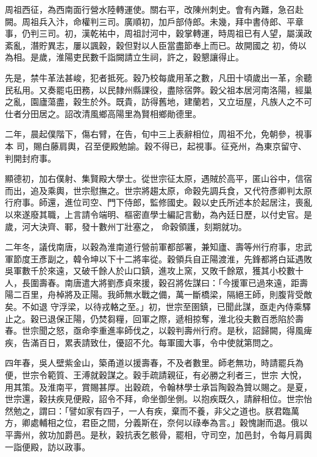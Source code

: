 \begin{pinyinscope}
 周祖西征，為西南面行營水陸轉運使。關右平，改陳州刺史。會有內難，急召赴闕。周祖兵入汴，命權判三司。廣順初，加戶部侍郎。未幾，拜中書侍郎、平章事，仍判三司。初，漢乾祐中，周祖討河中，穀掌轉運，時周祖已有人望，屬漢政紊亂，潛貯異志，屢以諷穀，穀但對以人臣當盡節奉上而已。故開國之
 初，倚以為相。是歲，淮陽吏民數千詣闕請立生祠，許之，穀懇讓得止。



 先是，禁牛革法甚峻，犯者抵死。穀乃校每歲用革之數，凡田十頃歲出一革，余聽民私用。又奏罷屯田務，以民隸州縣課役，盡除宿弊。穀父祖本居河南洛陽，經巢之亂，園廬蕩盡，穀生於外。既貴，訪得舊地，建蘭若，又立垣屋，凡族人之不可仕者分田居之。詔改清風鄉高陽里為賢相鄉勛德里。



 二年，晨起僕階下，傷右臂，在告，旬中三上表辭相位，周祖不允，免朝參，視事本
 司，賜白藤肩輿，召至便殿勉諭。穀不得已，起視事。征兗州，為東京留守、判開封府事。



 顯德初，加右僕射、集賢殿大學士。從世宗征太原，遇賊於高平，匿山谷中，信宿而出，追及乘輿，世宗慰撫之。世宗將趨太原，命穀先調兵食，又代符彥卿判太原行府事。師還，進位司空、門下侍郎，監修國史。穀以史氏所述本於起居注，喪亂以來遂廢其職，上言請令端明、樞密直學士編記言動，為內廷日歷，以付史官。是歲，河大決齊、鄆，發十數州丁壯塞之，
 命穀領護，刻期就功。



 二年冬，議伐南唐，以穀為淮南道行營前軍都部署，兼知廬、壽等州行府事，忠武軍節度王彥副之，韓令坤以下十二將率從。穀領兵自正陽渡淮，先鋒都將白延遇敗吳軍數千於來遠，又破千餘人於山口鎮，進攻上窯，又敗千餘眾，獲其小校數十人，長圍壽春。南唐遣大將劉彥貞來援，穀召將佐謀曰：「今援軍已過來遠，距壽陽二百里，舟棹將及正陽。我師無水戰之備，萬一斷橋梁，隔絕王師，則腹背受敵矣。不如退
 守浮梁，以待戎輅之至。」初，世宗至圉鎮，已聞此謀，亟走內侍乘驛止之。穀已退保正陽，仍焚芻糧，回軍之際，遞相掠奪，淮北役夫數百悉陷於壽春。世宗聞之怒，亟命李重進率師伐之，以穀判壽州行府。是秋，詔歸闕，得風痺疾，告滿百日，累表請致仕，優詔不允。每軍國大事，令中使就第問之。



 四年春，吳人壁紫金山，築甬道以援壽春，不及者數里。師老無功，時請罷兵為便，世宗令範質、王溥就穀謀之。穀手疏請親征，有必勝之利者三，世宗
 大悅，用其策。及淮南平，賞賜甚厚。出穀疏，令翰林學士承旨陶穀為贊以賜之。是夏，世宗還，穀扶疾見便殿，詔令不拜，命坐御坐側。以抱疾既久，請辭相位。世宗怡然勉之，謂曰：「譬如家有四子，一人有疾，棄而不養，非父之道也。朕君臨萬方，卿處輔相之位，君臣之間，分義斯在，奈何以祿奉為言。」穀愧謝而退。俄以平壽州，敘功加爵邑。是秋，穀抗表乞骸骨，罷相，守司空，加邑封，令每月肩輿一詣便殿，訪以政事。




\end{pinyinscope}
